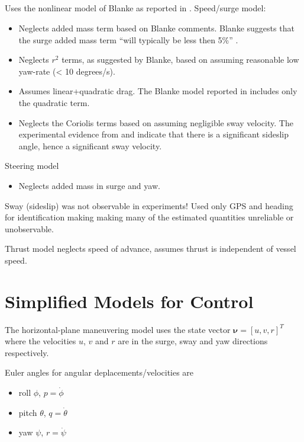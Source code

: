 \documentclass[11pt,draftcls,journal,onecolumn]{../latexlib/latex_ieee/IEEEtran}
\begin{document}
\subsection{\cite{caccia08practical}}
Uses the nonlinear model of Blanke \cite{blanke81ship} as reported in \cite{fossen94guidance}.  Speed/surge model:
\begin{itemize}
\item Neglects added mass term based on Blanke comments.  Blanke suggests that the surge added mass term ``will typically be less then 5\%'' \cite{fossen94guidance}.
\item Neglects $r^2$ terms, as suggested by Blanke, based on assuming reasonable low yaw-rate (< 10 degrees/s). 
\item Assumes linear+quadratic drag.  The Blanke model reported in \cite{fossen94guidance} includes only the quadratic term.  
\item Neglects the Coriolis terms based on assuming negligible sway velocity.  The experimental evidence from \cite{sonnenburg13modeling} and \cite{sonnenburg10control} indicate that there is a significant sideslip angle, hence a significant sway velocity.
\end{itemize}
Steering model
\begin{itemize}
\item Neglects added mass in surge and yaw.
\end{itemize}
Sway (sideslip) was not observable in experiments!  Used only GPS and heading for identification making making many of the estimated quantities unreliable or unobservable.

Thrust model neglects speed of advance, assumes thrust is independent of vessel speed.

\section{Simplified Models for Control}
The horizontal-plane maneuvering model uses the state vector $\bm{\nu}=[u,v,r]^T$ where the velocities $u$, $v$ and $r$ are in the surge, sway and yaw directions respectively. 

Euler angles for angular deplacements/velocities are
\begin{itemize}
\item roll $\phi$, $p=\dot{\phi}$
\item pitch $\theta$, $q=\dot{\theta}$
\item yaw $\psi$, $r=\dot{\psi}$
\end{itemize}
\end{document}

